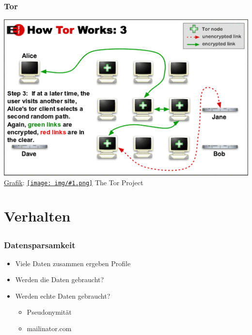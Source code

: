 \documentclass[12pt]{beamer}
\newcommand{\cc}[1]{\texttt{[image: img/\#1.png]}}
\begin{document}
\begin{frame}
    \frametitle{Tor}
    \includegraphics[height=0.7\textheight]{img/tor3.png}
    \\{\small \href{https://www.torproject.org/images/htw3.png}{Grafik}: \href{https://creativecommons.org/licenses/by/3.0/us/}{\cc{by}} The Tor Project}
\end{frame}

\section{Verhalten}
\subsection{}

\begin{frame}
    \frametitle{Datensparsamkeit}
    \begin{itemize}
        \item<2-> Viele Daten zusammen ergeben Profile
        \item<3-> Werden die Daten gebraucht?
        \item<4-> Werden echte Daten gebraucht?
            \begin{itemize}
              \item<5-> Pseudonymität
              \item<6-> mailinator.com
            \end{itemize}
    \end{itemize}
\end{frame}
\end{document}
